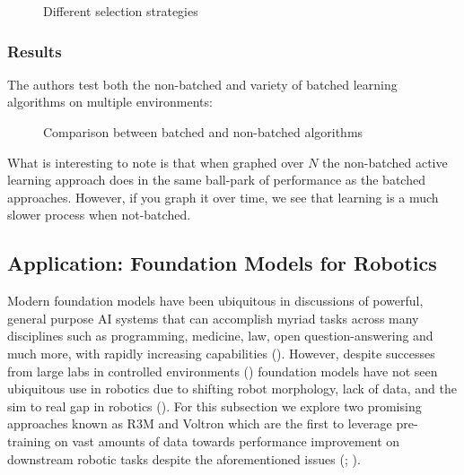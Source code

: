 \documentclass[
  letterpaper,
  numbers=noenddot,
  DIV=11]{scrreprt}
\theoremstyle{definition}
\theoremstyle{plain}
\theoremstyle{plain}
\theoremstyle{remark}
\begin{document}
\begin{figure}


\caption{\label{fig-selection-strategy}Different selection strategies}

\end{figure}%

\subsubsection*{Results}\label{results}

The authors test both the non-batched and variety of batched learning
algorithms on multiple environments:

\begin{figure}


\caption{\label{fig-batch-nonbatch}Comparison between batched and
non-batched algorithms}

\end{figure}%

What is interesting to note is that when graphed over \(N\) the
non-batched active learning approach does in the same ball-park of
performance as the batched approaches. However, if you graph it over
time, we see that learning is a much slower process when not-batched.

\subsection{Application: Foundation Models for
Robotics}\label{application-foundation-models-for-robotics}

Modern foundation models have been ubiquitous in discussions of
powerful, general purpose AI systems that can accomplish myriad tasks
across many disciplines such as programming, medicine, law, open
question-answering and much more, with rapidly increasing capabilities
().
However, despite successes from large labs in controlled environments
() foundation models
have not seen ubiquitous use in robotics due to shifting robot
morphology, lack of data, and the sim to real gap in robotics
(). For this
subsection we explore two promising approaches known as R3M and Voltron
which are the first to leverage pre-training on vast amounts of data
towards performance improvement on downstream robotic tasks despite the
aforementioned issues (;
).
\end{document}
